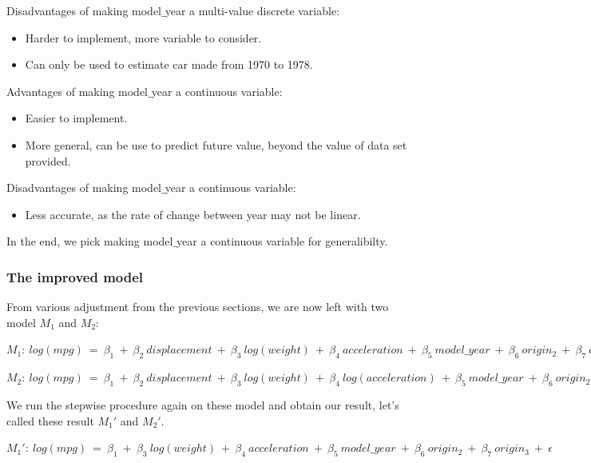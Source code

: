 Disadvantages of making model$\_$year a multi-value discrete variable:
\begin{itemize}
    \item Harder to implement, more variable to consider.
    \item Can only be used to estimate car made from 1970 to 1978.
\end{itemize}

Advantages of making model$\_$year a continuous variable:
\begin{itemize}
    \item Easier to implement.
    \item More general, can be use to predict future value, beyond the value of data set provided.
\end{itemize}

Disadvantages of making model$\_$year a continuous variable:
\begin{itemize}
    \item Less accurate, as the rate of change between year may not be linear.
\end{itemize}

In the end, we pick making model$\_$year a continuous variable for generalibilty.

\subsubsection{The improved model}

From various adjustment from the previous sections, we are now left with two model $M_1$ and $M_2$:

\begin{center}
$
M_1: \ log(mpg) \ = \ \beta_1 \ + \ \beta_2 \ displacement \ + \ \beta_3 \ log(weight) \ + \ \beta_4 \ acceleration \ + \ \beta_5 \ model\_year \ + \ \beta_6 \ origin_2 \ + \ \beta_7 \ origin_3 \ + \ \epsilon
$
\end{center}

\begin{center}
$
M_2: \ log(mpg) \ = \ \beta_1 \ + \ \beta_2 \ displacement \ + \ \beta_3 \ log(weight) \ + \ \beta_4 \ log(acceleration) \ + \ \beta_5 \ model\_year \ + \ \beta_6 \ origin_2 \ + \ \beta_7 \ origin_3 \ + \ \epsilon
$
\end{center}

We run the stepwise procedure again on these model and obtain our result, let's called these result $M_1'$ and $M_2'$.

\begin{center}
$
M_1': \ log(mpg) \ = \ \beta_1 \ + \ \beta_3 \ log(weight) \ + \ \beta_4 \ acceleration \ + \ \beta_5 \ model\_year \ + \ \beta_6 \ origin_2 \ + \ \beta_7 \ origin_3 \ + \ \epsilon
$
\end{center}

